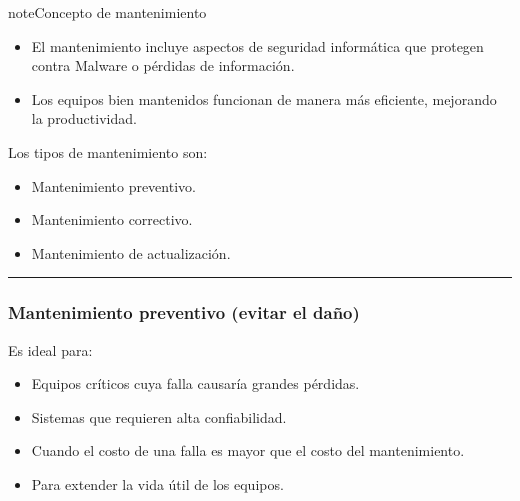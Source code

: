 \documentclass[letterpaper,10pt,spanish]{sphinxmanual}
\begin{document}
\begin{sphinxadmonition}{note}{Concepto de mantenimiento}
\begin{itemize}
\item {} 
\sphinxAtStartPar
{} El mantenimiento incluye aspectos de seguridad informática que protegen contra Malware o pérdidas de información.

\item {} 
\sphinxAtStartPar
{} Los equipos bien mantenidos funcionan de manera más eficiente, mejorando la productividad.

\end{itemize}

\sphinxAtStartPar
Los tipos de mantenimiento son:
\begin{itemize}
\item {} 
\sphinxAtStartPar
Mantenimiento preventivo.

\item {} 
\sphinxAtStartPar
Mantenimiento correctivo.

\item {} 
\sphinxAtStartPar
Mantenimiento de actualización.

\end{itemize}
\end{sphinxadmonition}


\bigskip\hrule\bigskip



\subsubsection{Mantenimiento preventivo (evitar el daño)}
\label{\detokenize{1_guias/10informatica/G1004:mantenimiento-preventivo-evitar-el-dano}}
\sphinxAtStartPar
Es ideal para:
\begin{itemize}
\item {} 
\sphinxAtStartPar
Equipos críticos cuya falla causaría grandes pérdidas.

\item {} 
\sphinxAtStartPar
Sistemas que requieren alta confiabilidad.

\item {} 
\sphinxAtStartPar
Cuando el costo de una falla es mayor que el costo del mantenimiento.

\item {} 
\sphinxAtStartPar
Para extender la vida útil de los equipos.

\end{itemize}
\end{document}
